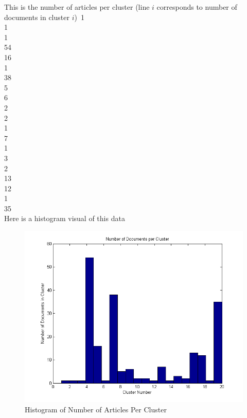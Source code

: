 \documentclass[twoside,11pt]{article}
\theoremstyle{definition}
\begin{document}
This is the number of articles per cluster (line $i$ corresponds to number of documents in cluster $i$)\:\
1     \\
1     \\
1    \\
54    \\
16     \\
1    \\
38     \\
5     \\
6     \\
2     \\
2     \\
1     \\
7     \\
1     \\
3\\
2\\
13    \\
12     \\
1    \\
35\\
\newpage
Here is a histogram visual of this data

\begin{figure}[h]
\centering
\includegraphics[width=6 in]{prob2PartC.png}
\caption{Histogram of Number of Articles Per Cluster}
\end{figure}

\newpage
\end{document}
